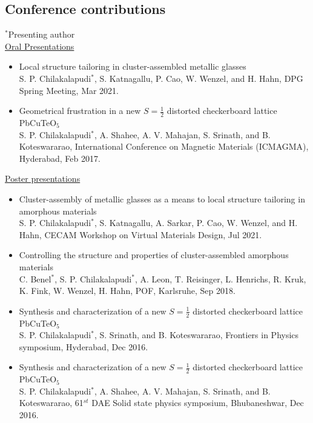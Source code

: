\subsection*{Conference contributions}
$^*$Presenting author \\

\underline{Oral Presentations}
\begin{itemize}%
	\item \textsf{Local structure tailoring in \cz cluster-assembled metallic glasses}\\
	S. P. Chilakalapudi$^*$, S. Katnagallu, P. Cao, W. Wenzel, and H. Hahn, DPG Spring Meeting, Mar 2021.
	
	\item \textsf{Geometrical frustration in a new $S=\frac{1}{2}$ distorted checkerboard lattice PbCuTeO$_5$}\\
	S. P. Chilakalapudi$^*$, A. Shahee, A. V. Mahajan, S. Srinath, and B. Koteswararao, International Conference on Magnetic Materials (ICMAGMA), Hyderabad, Feb 2017.
\end{itemize}

\underline{Poster presentations}
\begin{itemize}%
	\item \textsf{Cluster-assembly of metallic glasses as a means to local structure tailoring in amorphous materials}\\
	S. P. Chilakalapudi$^*$, S. Katnagallu, A. Sarkar, P. Cao, W. Wenzel, and H. Hahn, CECAM Workshop on Virtual Materials Design, Jul 2021.
	
	\item \textsf{Controlling the structure and properties of cluster-assembled amorphous materials} \\
	C. Benel$^*$, S. P. Chilakalapudi$^*$, A. Leon, T. Reisinger, L. Henrichs, R. Kruk, K. Fink, W. Wenzel, H. Hahn, POF, Karlsruhe, Sep 2018.
	
	\item \textsf{Synthesis and characterization of a new $S=\frac{1}{2}$ distorted checkerboard lattice PbCuTeO$_5$}\\
	S. P. Chilakalapudi$^*$, S. Srinath, and B. Koteswararao, Frontiers in Physics symposium, Hyderabad, Dec 2016.
	
	\item \textsf{Synthesis and characterization of a new $S=\frac{1}{2}$ distorted checkerboard lattice PbCuTeO$_5$}\\
	S. P. Chilakalapudi$^*$, A. Shahee, A. V. Mahajan, S. Srinath, and B. Koteswararao, 61$^{st}$ DAE Solid state physics symposium, Bhubaneshwar, Dec 2016.
\end{itemize}

